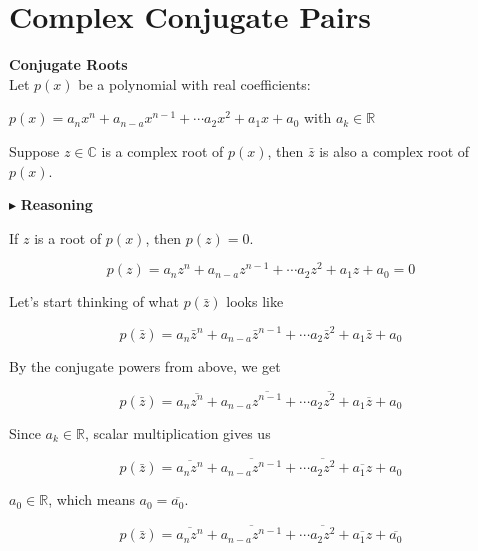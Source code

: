 \documentclass{ximera}
\begin{document}
\section{Complex Conjugate Pairs}




\begin{theorem} \textbf{\textcolor{blue!55!black}{Conjugate Roots}}   \\



Let $p(x)$ be a polynomial with real coefficients:

$p(x) = a_n x^n + a_{n-a} x^{n-1} + \cdots a_2 x^2 + a_1 x + a_0$   with $a_k \in \mathbb{R}$

Suppose $z \in \mathbb{C}$ is a complex root of $p(x)$, then $\bar{z}$ is also a complex root of $p(x)$.


\end{theorem}







$\blacktriangleright$ \textbf{Reasoning}




If $z$ is a root of $p(x)$, then $p(z) = 0$.


\[    p(z) = a_n z^n + a_{n-a} z^{n-1} + \cdots a_2 z^2 + a_1 z + a_0  = 0   \]


Let's start thinking of what $p(\bar{z})$ looks like



\[    p(\bar{z}) = a_n \bar{z}^n + a_{n-a} \bar{z}^{n-1} + \cdots a_2 \bar{z}^2 + a_1 \bar{z} + a_0    \]


By the conjugate powers from above, we get 


\[    p(\bar{z}) = a_n \overline{z^n} + a_{n-a} \overline{z^{n-1}} + \cdots a_2 \overline{z^2} + a_1 \overline{z} + a_0    \]



Since $a_k \in \mathbb{R}$, scalar multiplication gives us




\[    p(\bar{z}) = \overline{a_n z^n} +  \overline{a_{n-a} z^{n-1}} + \cdots  \overline{a_2 z^2} +  \overline{a_1 z} + a_0    \]



$a_0 \in \mathbb{R}$, which means $a_0 = \overline{a_0}$.



\[    p(\bar{z}) = \overline{a_n z^n} +  \overline{a_{n-a} z^{n-1}} + \cdots  \overline{a_2 z^2} +  \overline{a_1 z} + \overline{a_0}    \]
\end{document}
